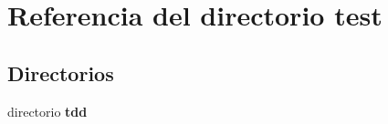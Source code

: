 \section{Referencia del directorio test}
\label{dir_13e138d54eb8818da29c3992edef070a}
\subsection*{Directorios}
\begin{DoxyCompactItemize}
\item 
directorio {\bf tdd}
\end{DoxyCompactItemize}
